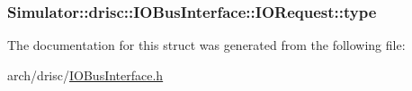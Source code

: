 \hypertarget{struct_simulator_1_1drisc_1_1_i_o_bus_interface_1_1_i_o_request_a8c1c887d3bef0611a8c9a670c7ae4bd5}{
\subsubsection[{type}]{ Simulator\+::drisc\+::\+I\+O\+Bus\+Interface\+::\+I\+O\+Request\+::type}}\label{struct_simulator_1_1drisc_1_1_i_o_bus_interface_1_1_i_o_request_a8c1c887d3bef0611a8c9a670c7ae4bd5}


The documentation for this struct was generated from the following file\+:\begin{DoxyCompactItemize}
\item 
arch/drisc/\hyperlink{_i_o_bus_interface_8h}{I\+O\+Bus\+Interface.\+h}\end{DoxyCompactItemize}
